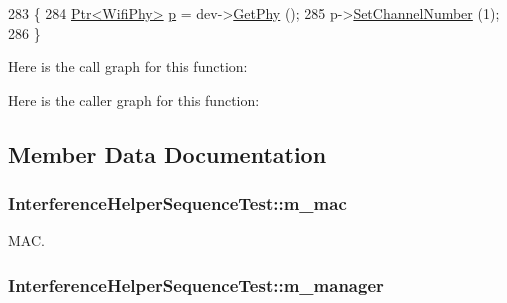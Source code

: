 \begin{DoxyCode}
283 \{
284   \hyperlink{classns3_1_1Ptr}{Ptr<WifiPhy>} \hyperlink{lte__link__budget_8m_ac9de518908a968428863f829398a4e62}{p} = dev->\hyperlink{classns3_1_1WifiNetDevice_a6a752f4afd2e28b04c83ba26568efd78}{GetPhy} ();
285   p->\hyperlink{classns3_1_1WifiPhy_a2d13cf6ae4c185cae8516516afe4a32a}{SetChannelNumber} (1);
286 \}
\end{DoxyCode}


Here is the call graph for this function\+:




Here is the caller graph for this function\+:




\subsection{Member Data Documentation}
\subsubsection[{\texorpdfstring{m\+\_\+mac}{m_mac}}]{ Interference\+Helper\+Sequence\+Test\+::m\+\_\+mac\hspace{0.3cm}{\ttfamily [private]}}\hypertarget{classInterferenceHelperSequenceTest_ac01570a00a54e92493699f76e7dc29db}{}\label{classInterferenceHelperSequenceTest_ac01570a00a54e92493699f76e7dc29db}


M\+AC. 

\subsubsection[{\texorpdfstring{m\+\_\+manager}{m_manager}}]{ Interference\+Helper\+Sequence\+Test\+::m\+\_\+manager\hspace{0.3cm}{\ttfamily [private]}}\hypertarget{classInterferenceHelperSequenceTest_a8b2a30399b0e12456e64bbb378ef5c5c}{}\label{classInterferenceHelperSequenceTest_a8b2a30399b0e12456e64bbb378ef5c5c}


